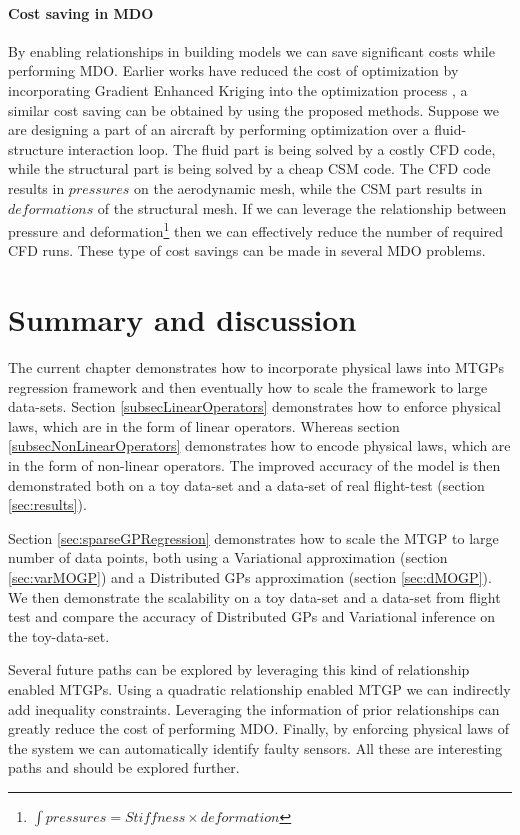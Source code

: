 \paragraph{Cost saving in MDO}
By enabling relationships in building models we can save significant costs while performing MDO. Earlier works have reduced the cost of optimization by incorporating Gradient Enhanced Kriging into the optimization process \cite{liem2015surrogate}, a similar cost saving can be obtained by using the proposed methods. Suppose we are designing a part of an aircraft by performing optimization over a fluid-structure interaction loop. The fluid part is being solved by a costly CFD code, while the structural part is being solved by a cheap CSM code. The CFD code results in $pressures$ on the aerodynamic mesh, while the CSM part results in $deformations$ of the structural mesh. If we can leverage the relationship between pressure and deformation\footnote{$\int pressures = Stiffness \times deformation$} then we can effectively reduce the number of required CFD runs. These type of cost savings can be made in several MDO problems. 


\section{Summary and discussion}
The current chapter demonstrates how to incorporate physical laws into MTGPs regression framework and then eventually how to scale the framework to large data-sets. Section \ref{subsecLinearOperators} demonstrates how to enforce physical laws, which are in the form of linear operators. Whereas section \ref{subsecNonLinearOperators} demonstrates how to encode physical laws, which are in the form of non-linear operators. The improved accuracy of the model is then demonstrated both on a toy data-set and a data-set of real flight-test (section \ref{sec:results}). 

Section \ref{sec:sparseGPRegression} demonstrates how to scale the MTGP to large number of data points, both using a Variational approximation (section \ref{sec:varMOGP}) and a Distributed GPs approximation (section \ref{sec:dMOGP}). We then demonstrate the scalability on a toy data-set and a data-set from flight test and compare the accuracy of Distributed GPs and Variational inference on the toy-data-set. 

Several future paths can be explored by leveraging this kind of relationship enabled MTGPs. Using a quadratic relationship enabled MTGP we can indirectly add inequality constraints. Leveraging the information of prior relationships can greatly reduce the cost of performing MDO. Finally, by enforcing physical laws of the system we can automatically identify faulty sensors. All these are interesting paths and should be explored further. 


